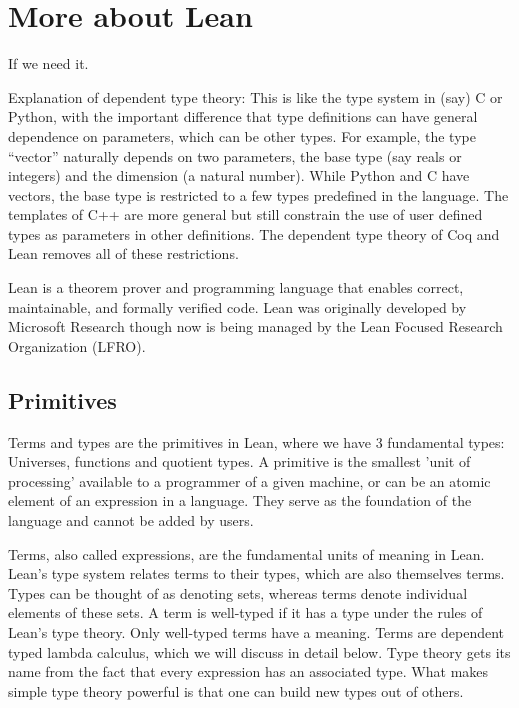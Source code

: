 \documentclass{article}
\newcommand{\1}{\mathbbm{1}}
\theoremstyle{plain}
\theoremstyle{definition}
\numberwithin{equation}{section}
\begin{document}
\appendix

\section{More about Lean}

If we need it.

Explanation of dependent type theory:
This is like the type system in (say) C or Python, with the important difference that type definitions can have
general dependence on parameters, which can be other types.  
For example, the type ``vector'' naturally depends on two parameters, the base
type (say reals or integers) and the dimension (a natural number).  While Python and C have vectors, the base type
is restricted to a few types predefined in the language.  The templates of C++ are more general but still constrain
the use of user defined types as parameters in other definitions.  The dependent type theory of Coq and Lean
removes all of these restrictions.

Lean is a theorem prover and programming language that enables correct, maintainable, and formally verified code. Lean was originally developed by Microsoft Research though now is being managed by the Lean Focused Research Organization (LFRO). 

\subsection{Primitives}

Terms and types are the primitives in Lean, where we have 3 fundamental types: Universes, functions and quotient types. A primitive is the smallest 'unit of processing' available to a programmer of a given machine, or can be an atomic element of an expression in a language. They serve as the foundation of the language and cannot be added by users. 

Terms, also called expressions, are the fundamental units of meaning in Lean.  Lean's type system relates terms to their types, which are also themselves terms. Types can be thought of as denoting sets, whereas terms denote individual elements of these sets. A term is well-typed if it has a type under the rules of Lean's type theory. Only well-typed terms have a meaning. Terms are dependent typed lambda calculus, which we will discuss  in detail below. Type theory gets its name from the fact that every expression has an associated type. What makes simple type theory powerful is that one can build new types out of others. 
\end{document}
